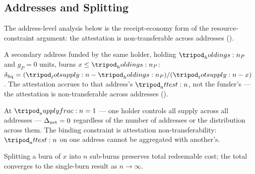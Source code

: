\documentclass[../main.tex]{subfiles}
\begin{document}
\subsection{Addresses and Splitting}
\label{sec:costliness:splitting}

The address-level analysis below is the receipt-economy form of the resource-constraint
argument: the attestation is non-transferable across addresses
().

\begin{proposition}
    \label{prop:costliness:address-splitting-cost}
    A secondary address funded by the same holder, holding $\holdings{}_P$ \liveclass{} and
    $g_P = 0$ \tlockclass{} units, burns $x \leq \holdings{}_P$:
    $\redeemratio = (\totsupply{} - \holdings{}_P)/(\totsupply{} - x)$. The attestation
    accrues to that address's $\attest{}$, not the funder's --- the attestation is
    non-transferable across addresses ().
\end{proposition}

\begin{proposition}
    \label{prop:costliness:portfolio-net-cost}
    At $\supplyfrac{} = 1$ --- one holder controls all supply across all addresses ---
    $\Delta\sb{\mathrm{net}} = 0$ regardless of the number of addresses or the distribution across them.
    The binding constraint is attestation non-transferability: $\attest{}$ on one address
    cannot be aggregated with another's.
\end{proposition}

\begin{proposition}
    \label{prop:costliness:splitting-invariance}
    Splitting a burn of $x$ into $n$ sub-burns preserves total redeemable cost; the total
    converges to the single-burn result as $n \to \infty$.
\end{proposition}

\end{document}
